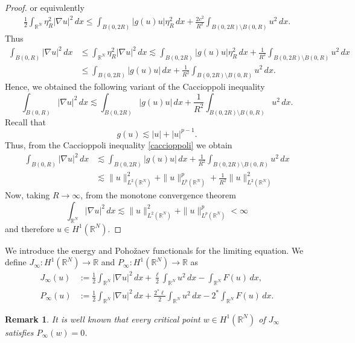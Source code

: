 \documentclass[12pt,leqno,twoside,sort]{amsart}
\newtheorem{Rem}[Th]{Remark}
\newcommand{\R}{\mathbb{R}}
\numberwithin{equation}{section}
\begin{document}
\begin{proof}
or equivalently
\begin{align*}
\frac12 \int_{\R^N} \eta_R^2 |\nabla u|^2 \, dx \leq \int_{B(0,2R)} |g(u) u| \eta_R^2 \, dx + \frac{2c^2}{R^2} \int_{B(0,2R) \setminus B(0,R)} u^2 \, dx.
\end{align*}
Thus
\begin{align*}
\int_{B(0,R)} |\nabla u|^2 \, dx &\leq \int_{\R^N} \eta_R^2 |\nabla u|^2 \, dx \lesssim \int_{B(0,2R)} |g(u) u| \eta_R^2 \, dx + \frac{1}{R^2} \int_{B(0,2R) \setminus B(0,R)} u^2 \, dx \\
&\leq \int_{B(0,2R)} |g(u) u| \, dx + \frac{1}{R^2} \int_{B(0,2R) \setminus B(0,R)} u^2 \, dx.
\end{align*}
Hence, we obtained the following variant of the Caccioppoli inequality 
\begin{equation}\label{caccioppoli}
    \int_{B(0,R)} |\nabla u|^2 \, dx \lesssim \int_{B(0,2R)} |g(u) u| \, dx + \frac{1}{R^2} \int_{B(0,2R) \setminus B(0,R)} u^2 \, dx.
\end{equation}
Recall that
$$
g(u) \lesssim |u| + |u|^{p-1}.
$$
Thus, from the Caccioppoli inequality \eqref{caccioppoli} we obtain
\begin{align*}
\int_{B(0,R)} |\nabla u|^2 \, dx &\lesssim \int_{B(0,2R)} |g(u) u| \, dx + \frac{1}{R^2} \int_{B(0,2R) \setminus B(0,R)} u^2 \, dx \\
&\lesssim \|u\|_{L^2 (\R^N)}^2 + \|u\|_{L^p (\R^N)}^p  + \frac{1}{R^2} \|u\|_{L^2 (\R^N)}^2
\end{align*}
Now, taking $R \to \infty$, from the monotone convergence theorem
$$
\int_{\R^N} |\nabla u|^2 \, dx \lesssim \|u\|_{L^2 (\R^N)}^2 + \|u\|_{L^p (\R^N)}^p < \infty
$$
and therefore $u \in H^1 (\R^N)$.
\end{proof}





We introduce the energy and Poho\v{z}aev functionals for the limiting equation. We define ${J_\infty : H^1 (\R^N) \rightarrow \R}$ and $P_\infty : H^1 (\R^N) \rightarrow \R$ as
\begin{align*}
J_\infty(u) &:= \frac12 \int_{\R^N} |\nabla u|^2 \, dx + \frac{\ell}{2} \int_{\R^N} u^2 \, dx - \int_{\R^N} F(u) \, dx, \\
P_{\infty}(u) &:= \frac12 \int_{\R^N} |\nabla u|^2 \, dx + \frac{2^* \ell}{2} \int_{\R^N} u^2 \, dx - 2^* \int_{\R^N}  F(u) \, dx.
\end{align*}

\begin{Rem}\label{R:problem_graniczny_wlasnosci}
It is well known that every critical point $w \in H^1 (\R^N)$ of $J_\infty$ satisfies $P_\infty(w) = 0$.
\end{Rem}
\end{document}
